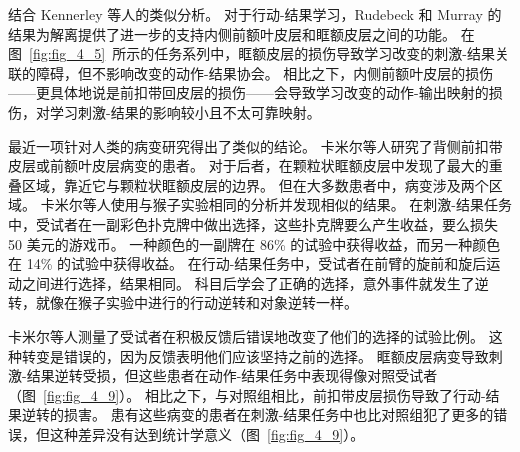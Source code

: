 结合 Kennerley 等人的类似分析\cite{kennerley2006optimal}。
对于行动-结果学习，Rudebeck 和 Murray 的结果为解离提供了进一步的支持内侧前额叶皮层和眶额皮层之间的功能。
在图~\ref{fig:fig_4_5}~所示的任务系列中，眶额皮层的损伤导致学习改变的刺激-结果关联的障碍，但不影响改变的动作-结果协会。
相比之下，内侧前额叶皮层的损伤——更具体地说是前扣带回皮层的损伤——会导致学习改变的动作-输出映射的损伤，对学习刺激-结果的影响较小且不太可靠映射。\par


最近一项针对人类的病变研究得出了类似的结论。
卡米尔等人\cite{camille2011double}研究了背侧前扣带皮层或前额叶皮层病变的患者。
对于后者，在颗粒状眶额皮层中发现了最大的重叠区域，靠近它与颗粒状眶额皮层的边界。
但在大多数患者中，病变涉及两个区域。
卡米尔等人使用与猴子实验相同的分析并发现相似的结果。
在刺激-结果任务中，受试者在一副彩色扑克牌中做出选择，这些扑克牌要么产生收益，要么损失 50 美元的游戏币。
一种颜色的一副牌在 86\% 的试验中获得收益，而另一种颜色在 14\% 的试验中获得收益。
在行动-结果任务中，受试者在前臂的旋前和旋后运动之间进行选择，结果相同。
科目后学会了正确的选择，意外事件就发生了逆转，就像在猴子实验中进行的行动逆转和对象逆转一样。\par


卡米尔等人测量了受试者在积极反馈后错误地改变了他们的选择的试验比例。
这种转变是错误的，因为反馈表明他们应该坚持之前的选择。
眶额皮层病变导致刺激-结果逆转受损，但这些患者在动作-结果任务中表现得像对照受试者（图~\ref{fig:fig_4_9}）。
相比之下，与对照组相比，前扣带皮层损伤导致了行动-结果逆转的损害。
患有这些病变的患者在刺激-结果任务中也比对照组犯了更多的错误，但这种差异没有达到统计学意义（图~\ref{fig:fig_4_9}）。\par


